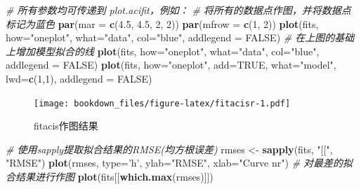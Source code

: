 \documentclass[]{krantz}
\makeatletter
\newenvironment{Shaded}{\begin{snugshade}}{\end{snugshade}}
\newcommand{\KeywordTok}[1]{\textcolor[rgb]{0.13,0.29,0.53}{\textbf{#1}}}
\newcommand{\DataTypeTok}[1]{\textcolor[rgb]{0.13,0.29,0.53}{#1}}
\newcommand{\DecValTok}[1]{\textcolor[rgb]{0.00,0.00,0.81}{#1}}
\newcommand{\FloatTok}[1]{\textcolor[rgb]{0.00,0.00,0.81}{#1}}
\newcommand{\StringTok}[1]{\textcolor[rgb]{0.31,0.60,0.02}{#1}}
\newcommand{\CommentTok}[1]{\textcolor[rgb]{0.56,0.35,0.01}{\textit{#1}}}
\newcommand{\OtherTok}[1]{\textcolor[rgb]{0.56,0.35,0.01}{#1}}
\newcommand{\NormalTok}[1]{#1}
\newenvironment{kframe}{%
\medskip{}
\setlength{\fboxsep}{.8em}
 \def\at@end@of@kframe{}%
 \ifinner\ifhmode%
  \def\at@end@of@kframe{\end{minipage}}%
  \begin{minipage}{\columnwidth}%
 \fi\fi%
 \def\FrameCommand##1{\hskip\@totalleftmargin \hskip-\fboxsep
 \colorbox{shadecolor}{##1}\hskip-\fboxsep
     \hskip-\linewidth \hskip-\@totalleftmargin \hskip\columnwidth}%
 \MakeFramed {\advance\hsize-\width
   \@totalleftmargin\z@ \linewidth\hsize
   \@setminipage}}%
 {\par\unskip\endMakeFramed%
 \at@end@of@kframe}
\renewenvironment{Shaded}{\begin{kframe}}{\end{kframe}}
\theoremstyle{definition}
\theoremstyle{definition}
\theoremstyle{definition}
\theoremstyle{remark}
\makeatother
\begin{document}
\begin{Shaded}
\begin{Highlighting}[]
\CommentTok{# 所有参数均可传递到 plot.acifit，例如：}
\CommentTok{# 将所有的数据点作图，并将数据点标记为蓝色}
\KeywordTok{par}\NormalTok{(}\DataTypeTok{mar =} \KeywordTok{c}\NormalTok{(}\FloatTok{4.5}\NormalTok{, }\FloatTok{4.5}\NormalTok{, }\DecValTok{2}\NormalTok{, }\DecValTok{2}\NormalTok{))}
\KeywordTok{par}\NormalTok{(}\DataTypeTok{mfrow =} \KeywordTok{c}\NormalTok{(}\DecValTok{1}\NormalTok{, }\DecValTok{2}\NormalTok{))}
\KeywordTok{plot}\NormalTok{(fits, }\DataTypeTok{how=}\StringTok{"oneplot"}\NormalTok{, }\DataTypeTok{what=}\StringTok{"data"}\NormalTok{, }\DataTypeTok{col=}\StringTok{"blue"}\NormalTok{, }\DataTypeTok{addlegend =} \OtherTok{FALSE}\NormalTok{)}
\CommentTok{# 在上图的基础上增加模型拟合的线}
\KeywordTok{plot}\NormalTok{(fits, }\DataTypeTok{how=}\StringTok{"oneplot"}\NormalTok{, }\DataTypeTok{what=}\StringTok{"data"}\NormalTok{, }\DataTypeTok{col=}\StringTok{"blue"}\NormalTok{, }\DataTypeTok{addlegend =} \OtherTok{FALSE}\NormalTok{)}
\KeywordTok{plot}\NormalTok{(fits, }\DataTypeTok{how=}\StringTok{"oneplot"}\NormalTok{, }\DataTypeTok{add=}\OtherTok{TRUE}\NormalTok{, }\DataTypeTok{what=}\StringTok{"model"}\NormalTok{, }\DataTypeTok{lwd=}\KeywordTok{c}\NormalTok{(}\DecValTok{1}\NormalTok{,}\DecValTok{1}\NormalTok{), }\DataTypeTok{addlegend =} \OtherTok{FALSE}\NormalTok{)}
\end{Highlighting}
\end{Shaded}

\begin{figure}
\centering
\texttt{[image: bookdown\_files/figure-latex/fitacisr-1.pdf]}
\caption{\label{fig:fitacisr}fitacis作图结果}
\end{figure}

\begin{Shaded}
\begin{Highlighting}[]
\CommentTok{# 使用sapply提取拟合结果的RMSE(均方根误差)}
\NormalTok{rmses <-}\StringTok{ }\KeywordTok{sapply}\NormalTok{(fits, }\StringTok{"[["}\NormalTok{, }\StringTok{"RMSE"}\NormalTok{)}
\KeywordTok{plot}\NormalTok{(rmses, }\DataTypeTok{type=}\StringTok{'h'}\NormalTok{, }\DataTypeTok{ylab=}\StringTok{"RMSE"}\NormalTok{, }\DataTypeTok{xlab=}\StringTok{"Curve nr"}\NormalTok{)}
\CommentTok{# 对最差的拟合结果进行作图}
\KeywordTok{plot}\NormalTok{(fits[[}\KeywordTok{which.max}\NormalTok{(rmses)]])}
\end{Highlighting}
\end{Shaded}
\end{document}
